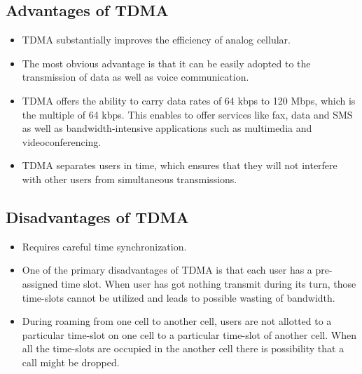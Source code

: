 \subsection{Advantages of TDMA}
\begin{itemize}
\item TDMA substantially improves the efficiency of analog cellular.
\item The most obvious advantage is that it can be easily adopted to the transmission of data as well as voice communication.
\item TDMA offers the ability to carry data rates of 64 kbps to 120 Mbps, which is the multiple of 64 kbps. This enables to offer services like fax, data and SMS as well as bandwidth-intensive applications such as multimedia and videoconferencing.
\item TDMA separates users in time, which ensures that they will not interfere with other users from simultaneous transmissions.
\end{itemize}
\subsection{Disadvantages of TDMA}
\begin{itemize}
\item Requires careful time synchronization.
\item One of the primary disadvantages of TDMA is that each user has a pre-assigned time slot. When user has got nothing transmit during its turn, those time-slots cannot be utilized and leads to possible wasting of bandwidth.
\item During roaming from one cell to another cell, users are not allotted to a particular time-slot on one cell to a particular time-slot of another cell. When all the time-slots are occupied in the another cell there is possibility that a call might be dropped.
\end{itemize}
